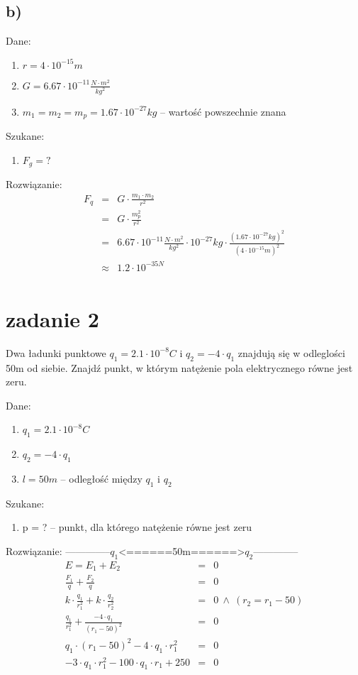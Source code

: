 \documentclass[svgnames]{report}
\begin{document}
\subsection{b)}
Dane:
\begin{enumerate}
	\item $r = 4\cdot 10^{-15}m $
	\item $G = 6.67 \cdot 10^{-11} \frac{N \cdot m^2}{kg^2}$
	\item $m_1 = m_2 = m_p = 1.67 \cdot 10^{-27} kg$ -- wartość powszechnie znana
\end{enumerate}
Szukane:
\begin{enumerate}
	\item $F_g = ?$
\end{enumerate}
Rozwiązanie:
\begin{eqnarray*}
F_q	&=& G \cdot \frac{m_1 \cdot m_2}{r^2}	\\
	&=& G \cdot \frac{m_p^2}{r^2}	\\
	&=& 6.67 \cdot 10^{-11} \frac{N \cdot m^2}{kg^2} \cdot 10^{-27} kg \cdot \frac{(1.67 \cdot 10^{-27} kg)^2}{(4 \cdot 10^{-15} m)^2}	\\
	& \approx & 1.2 \cdot 10^{-35N}	\\
\end{eqnarray*}

\section{zadanie 2}
\begin{framed}
	Dwa ładunki punktowe $q_1 = 2.1 \cdot 10^{-8} C$ i $q_2 = -4 \cdot q_1$ znajdują się w odleglości 50m od siebie. Znajdź punkt, w którym natężenie pola elektrycznego równe jest zeru.
\end{framed}
Dane:
\begin{enumerate}
	\item $q_1 = 2.1 \cdot 10^{-8} C$
	\item $q_2 = -4 \cdot q_1$
	\item $l = 50m$ -- odległość między $q_1$ i $q_2$
\end{enumerate}
Szukane:
\begin{enumerate}
	\item p = ? -- punkt, dla którego natężenie równe jest zeru
\end{enumerate}
Rozwiązanie:
--------------$q_1$<======50m======>$q_2$--------------
\begin{eqnarray*}
E = E_1 + E_2 &=& 0	\\
\frac{F_1}{q} + \frac{F_2}{q} &=& 0 \\
k \cdot \frac{q_1}{r_1^2}  + k \cdot \frac{q_2}{r_2^2} &=& 0 \ \wedge \ (r_2 = r_1 - 50) \\
\frac{q_1}{r_1^2} + \frac{-4\cdot q_1}{(r_1 - 50)^2} &=& 0 \\
q_1 \cdot (r_1 - 50)^2 -4 \cdot q_1 \cdot r_1^2 &=& 0 \\
-3 \cdot q_1 \cdot r_1^2 - 100 \cdot q_1 \cdot r_1 + 250 &=& 0 \\
\end{eqnarray*}
\end{document}
